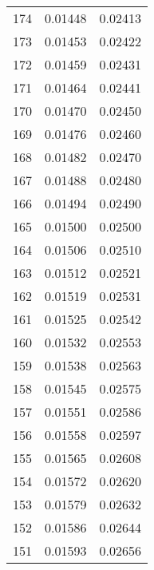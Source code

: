 \documentclass[11pt]{article}
\begin{document}
\begin{minipage}[l]{.3\linewidth}
\begin{tabular}{r|rr}
174&0.01448&0.02413\\ 
173&0.01453&0.02422\\ 
172&0.01459&0.02431\\ 
171&0.01464&0.02441\\ 
170&0.01470&0.02450\\ 
169&0.01476&0.02460\\ 
168&0.01482&0.02470\\ 
167&0.01488&0.02480\\ 
166&0.01494&0.02490\\ 
165&0.01500&0.02500\\ 
164&0.01506&0.02510\\ 
163&0.01512&0.02521\\ 
162&0.01519&0.02531\\ 
161&0.01525&0.02542\\ 
160&0.01532&0.02553\\ 
159&0.01538&0.02563\\ 
158&0.01545&0.02575\\ 
157&0.01551&0.02586\\ 
156&0.01558&0.02597\\ 
155&0.01565&0.02608\\ 
154&0.01572&0.02620\\ 
153&0.01579&0.02632\\ 
152&0.01586&0.02644\\ 
151&0.01593&0.02656\\ 
\end{tabular}
\end{minipage}
\hfill
\end{document}
